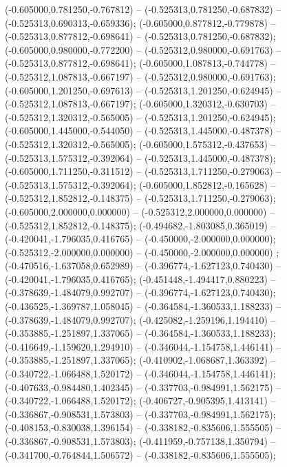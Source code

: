 (-0.605000,0.781250,-0.767812) -- (-0.525313,0.781250,-0.687832) -- (-0.525313,0.690313,-0.659336);
 (-0.605000,0.877812,-0.779878) -- (-0.525313,0.877812,-0.698641) -- (-0.525313,0.781250,-0.687832);
 (-0.605000,0.980000,-0.772200) -- (-0.525312,0.980000,-0.691763) -- (-0.525313,0.877812,-0.698641);
 (-0.605000,1.087813,-0.744778) -- (-0.525312,1.087813,-0.667197) -- (-0.525312,0.980000,-0.691763);
 (-0.605000,1.201250,-0.697613) -- (-0.525313,1.201250,-0.624945) -- (-0.525312,1.087813,-0.667197);
 (-0.605000,1.320312,-0.630703) -- (-0.525312,1.320312,-0.565005) -- (-0.525313,1.201250,-0.624945);
 (-0.605000,1.445000,-0.544050) -- (-0.525313,1.445000,-0.487378) -- (-0.525312,1.320312,-0.565005);
 (-0.605000,1.575312,-0.437653) -- (-0.525313,1.575312,-0.392064) -- (-0.525313,1.445000,-0.487378);
 (-0.605000,1.711250,-0.311512) -- (-0.525313,1.711250,-0.279063) -- (-0.525313,1.575312,-0.392064);
 (-0.605000,1.852812,-0.165628) -- (-0.525312,1.852812,-0.148375) -- (-0.525313,1.711250,-0.279063);
 (-0.605000,2.000000,0.000000) -- (-0.525312,2.000000,0.000000) -- (-0.525312,1.852812,-0.148375);
 (-0.494682,-1.803085,0.365019) -- (-0.420041,-1.796035,0.416765) -- (-0.450000,-2.000000,0.000000);
 (-0.525312,-2.000000,0.000000) -- (-0.450000,-2.000000,0.000000) ;
 (-0.470516,-1.637058,0.652989) -- (-0.396774,-1.627123,0.740430) -- (-0.420041,-1.796035,0.416765);
 (-0.451448,-1.494417,0.880223) -- (-0.378639,-1.484079,0.992707) -- (-0.396774,-1.627123,0.740430);
 (-0.436525,-1.369787,1.058045) -- (-0.364584,-1.360533,1.188233) -- (-0.378639,-1.484079,0.992707);
 (-0.425082,-1.259196,1.194410) -- (-0.353885,-1.251897,1.337065) -- (-0.364584,-1.360533,1.188233);
 (-0.416649,-1.159620,1.294910) -- (-0.346044,-1.154758,1.446141) -- (-0.353885,-1.251897,1.337065);
 (-0.410902,-1.068687,1.363392) -- (-0.340722,-1.066488,1.520172) -- (-0.346044,-1.154758,1.446141);
 (-0.407633,-0.984480,1.402345) -- (-0.337703,-0.984991,1.562175) -- (-0.340722,-1.066488,1.520172);
 (-0.406727,-0.905395,1.413141) -- (-0.336867,-0.908531,1.573803) -- (-0.337703,-0.984991,1.562175);
 (-0.408153,-0.830038,1.396154) -- (-0.338182,-0.835606,1.555505) -- (-0.336867,-0.908531,1.573803);
 (-0.411959,-0.757138,1.350794) -- (-0.341700,-0.764844,1.506572) -- (-0.338182,-0.835606,1.555505);
